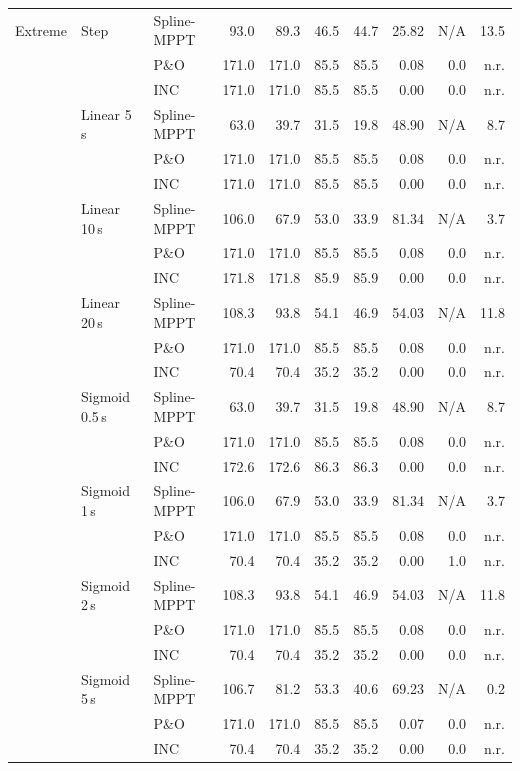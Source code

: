 \begin{longtable}{@{}lll rr rr r rr@{}}
\addlinespace[2pt]
Extreme & Step & Spline-MPPT & 93.0 & 89.3 & 46.5 & 44.7 & 25.82 & N/A & 13.5 \\
 &  & P\&O & 171.0 & 171.0 & 85.5 & 85.5 & 0.08 & 0.0 & n.r. \\
 &  & INC & 171.0 & 171.0 & 85.5 & 85.5 & 0.00 & 0.0 & n.r. \\
\addlinespace[2pt]
 & Linear 5\,s & Spline-MPPT & 63.0 & 39.7 & 31.5 & 19.8 & 48.90 & N/A & 8.7 \\
 &  & P\&O & 171.0 & 171.0 & 85.5 & 85.5 & 0.08 & 0.0 & n.r. \\
 &  & INC & 171.0 & 171.0 & 85.5 & 85.5 & 0.00 & 0.0 & n.r. \\
\addlinespace[2pt]
 & Linear 10\,s & Spline-MPPT & 106.0 & 67.9 & 53.0 & 33.9 & 81.34 & N/A & 3.7 \\
 &  & P\&O & 171.0 & 171.0 & 85.5 & 85.5 & 0.08 & 0.0 & n.r. \\
 &  & INC & 171.8 & 171.8 & 85.9 & 85.9 & 0.00 & 0.0 & n.r. \\
\addlinespace[2pt]
 & Linear 20\,s & Spline-MPPT & 108.3 & 93.8 & 54.1 & 46.9 & 54.03 & N/A & 11.8 \\
 &  & P\&O & 171.0 & 171.0 & 85.5 & 85.5 & 0.08 & 0.0 & n.r. \\
 &  & INC & 70.4 & 70.4 & 35.2 & 35.2 & 0.00 & 0.0 & n.r. \\
\addlinespace[2pt]
 & Sigmoid 0.5\,s & Spline-MPPT & 63.0 & 39.7 & 31.5 & 19.8 & 48.90 & N/A & 8.7 \\
 &  & P\&O & 171.0 & 171.0 & 85.5 & 85.5 & 0.08 & 0.0 & n.r. \\
 &  & INC & 172.6 & 172.6 & 86.3 & 86.3 & 0.00 & 0.0 & n.r. \\
\addlinespace[2pt]
 & Sigmoid 1\,s & Spline-MPPT & 106.0 & 67.9 & 53.0 & 33.9 & 81.34 & N/A & 3.7 \\
 &  & P\&O & 171.0 & 171.0 & 85.5 & 85.5 & 0.08 & 0.0 & n.r. \\
 &  & INC & 70.4 & 70.4 & 35.2 & 35.2 & 0.00 & 1.0 & n.r. \\
\addlinespace[2pt]
 & Sigmoid 2\,s & Spline-MPPT & 108.3 & 93.8 & 54.1 & 46.9 & 54.03 & N/A & 11.8 \\
 &  & P\&O & 171.0 & 171.0 & 85.5 & 85.5 & 0.08 & 0.0 & n.r. \\
 &  & INC & 70.4 & 70.4 & 35.2 & 35.2 & 0.00 & 0.0 & n.r. \\
\addlinespace[2pt]
 & Sigmoid 5\,s & Spline-MPPT & 106.7 & 81.2 & 53.3 & 40.6 & 69.23 & N/A & 0.2 \\
 &  & P\&O & 171.0 & 171.0 & 85.5 & 85.5 & 0.07 & 0.0 & n.r. \\
 &  & INC & 70.4 & 70.4 & 35.2 & 35.2 & 0.00 & 0.0 & n.r. \\
\end{longtable}
\endgroup
